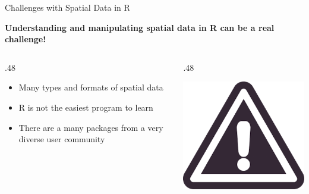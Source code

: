 \documentclass[10pt,ignorenonframetext,]{beamer}
\providecommand{\tightlist}{%
  \setlength{\itemsep}{0pt}\setlength{\parskip}{0pt}}
\def\begincols{\begin{columns}}
\def\begincol{\begin{column}}
\def\endcol{\end{column}}
\def\endcols{\end{columns}}
\begin{document}
\begin{frame}{Challenges with Spatial Data in R}

\textbf{Understanding and manipulating spatial data in R can be a real
challenge!}

\begincols
\begincol{.48\textwidth}

\begin{itemize}
\tightlist
\item
  Many types and formats of spatial data
\item
  R is not the easiest program to learn
\item
  There are a many packages from a very diverse user community
\end{itemize}

\endcol
\begincol{.48\textwidth}

\begin{center}\includegraphics[width=0.8\linewidth]{../images/alert_icon} \end{center}

\endcol
\endcols

\end{frame}
\end{document}
